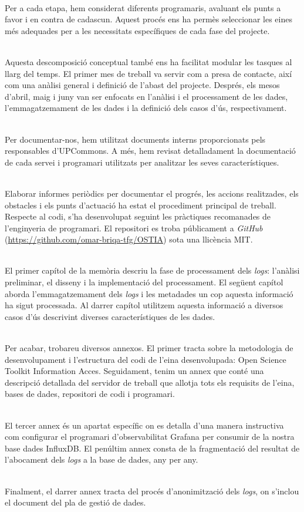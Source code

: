 \noindent \\
Per a cada etapa, hem considerat diferents programaris, avaluant els punts a favor i en contra de cadascun.
Aquest procés ens ha permès seleccionar les eines més adequades per a les necessitats específiques de cada fase del projecte.

\noindent \\
Aquesta descomposició conceptual també ens ha facilitat modular les tasques al llarg del temps.
El primer mes de treball va servir com a presa de contacte, així com una anàlisi general i definició de l'abast del projecte.
Després, els mesos d'abril, maig i juny van ser enfocats en l'anàlisi i el processament de les dades, l'emmagatzemament de les dades i la definició dels casos d'ús, respectivament.

\noindent \\
Per documentar-nos, hem utilitzat documents interns proporcionats pels responsables d'\gls{UPCommons}.
A més, hem revisat detalladament la documentació de cada servei i programari utilitzats per analitzar les seves característiques.

\noindent \\
Elaborar informes periòdics per documentar el progrés, les accions realitzades, els obstacles i els punts d'actuació ha estat el procediment principal de treball.
Respecte al codi, s'ha desenvolupat seguint les pràctiques recomanades de l'enginyeria de programari.
El repositori es troba públicament a \textit{\gls{GitHub}} (\url{https://github.com/omar-briqa-tfg/OSTIA}) sota una llicència MIT.

\noindent \\
El primer capítol de la memòria descriu la fase de processament dels \textit{\gls{log}s}: l'anàlisi preliminar, el disseny i la implementació del processament.
El següent capítol aborda l'emmagatzemament dels \textit{\gls{log}s} i les metadades un cop aquesta informació ha sigut processada.
Al darrer capítol utilitzem aquesta informació a diversos casos d'ús descrivint diverses característiques de les dades.

\noindent \\
Per acabar, trobareu diversos annexos.
El primer tracta sobre la metodologia de desenvolupament i l'estructura del codi de l'eina desenvolupada: Open Science Toolkit Information Acces.
Seguidament, tenim un annex que conté una descripció detallada del servidor de treball que allotja tots els requisits de l'eina, bases de dades, repositori de codi i programari.

\noindent \\
El tercer annex és un apartat específic on es detalla d'una manera instructiva com configurar el programari d'observabilitat Grafana per consumir de la nostra base dades InfluxDB.
El penúltim annex consta de la fragmentació del resultat de l'abocament dels \textit{\gls{log}s} a la base de dades, any per any.

\noindent \\
Finalment, el darrer annex tracta del procés d'anonimització dels \textit{\gls{log}s}, on s'inclou el document del pla de gestió de dades.